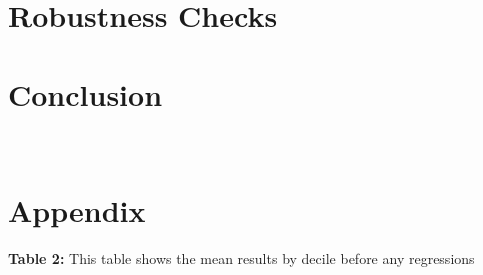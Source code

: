 \documentclass[12pt,oneside,reqno]{amsart}
\begin{document}
\section{Robustness Checks}
\label{Robustness}

\section{Conclusion}
\label{Conclusion}

{}


\\

\section{Appendix}
\vspace{1cm}
\textbf{Table 2:} This table shows the mean results by decile before any regressions\\
\vspace{1cm}





\clearpage
\restoregeometry


%
\end{document}
